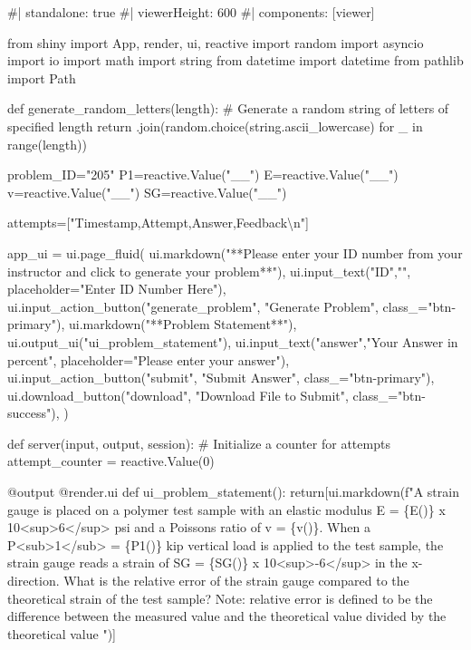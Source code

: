 \documentclass[
  letterpaper,
  DIV=11,
  numbers=noendperiod]{scrreprt}
\newenvironment{Shaded}{\begin{snugshade}}{\end{snugshade}}
\newcommand{\NormalTok}[1]{\textcolor[rgb]{0.00,0.23,0.31}{#1}}
\begin{document}
\begin{Shaded}
\begin{Highlighting}[]
\NormalTok{\#| standalone: true}
\NormalTok{\#| viewerHeight: 600}
\NormalTok{\#| components: [viewer]}

\NormalTok{from shiny import App, render, ui, reactive}
\NormalTok{import random}
\NormalTok{import asyncio}
\NormalTok{import io}
\NormalTok{import math}
\NormalTok{import string}
\NormalTok{from datetime import datetime}
\NormalTok{from pathlib import Path}

\NormalTok{def generate\_random\_letters(length):}
\NormalTok{    \# Generate a random string of letters of specified length}
\NormalTok{    return \textquotesingle{}\textquotesingle{}.join(random.choice(string.ascii\_lowercase) for \_ in range(length)) }

\NormalTok{problem\_ID="205"}
\NormalTok{P1=reactive.Value("\_\_")}
\NormalTok{E=reactive.Value("\_\_")}
\NormalTok{v=reactive.Value("\_\_")}
\NormalTok{SG=reactive.Value("\_\_")}



\NormalTok{attempts=["Timestamp,Attempt,Answer,Feedback\textbackslash{}n"]}

\NormalTok{app\_ui = ui.page\_fluid(}
\NormalTok{    ui.markdown("**Please enter your ID number from your instructor and click to generate your problem**"),}
\NormalTok{    ui.input\_text("ID","", placeholder="Enter ID Number Here"),}
\NormalTok{    ui.input\_action\_button("generate\_problem", "Generate Problem", class\_="btn{-}primary"),}
\NormalTok{    ui.markdown("**Problem Statement**"),}
\NormalTok{    ui.output\_ui("ui\_problem\_statement"),}
\NormalTok{    ui.input\_text("answer","Your Answer in percent", placeholder="Please enter your answer"),}
\NormalTok{    ui.input\_action\_button("submit", "Submit Answer", class\_="btn{-}primary"),}
\NormalTok{    ui.download\_button("download", "Download File to Submit", class\_="btn{-}success"),}
\NormalTok{)}


\NormalTok{def server(input, output, session):}
\NormalTok{    \# Initialize a counter for attempts}
\NormalTok{    attempt\_counter = reactive.Value(0)}

\NormalTok{    @output}
\NormalTok{    @render.ui}
\NormalTok{    def ui\_problem\_statement():}
\NormalTok{        return[ui.markdown(f"A strain gauge is placed on a polymer test sample with an elastic modulus E =  \{E()\} x 10\textless{}sup\textgreater{}6\textless{}/sup\textgreater{} psi and a Poisson\textquotesingle{}s ratio of v = \{v()\}. When a P\textless{}sub\textgreater{}1\textless{}/sub\textgreater{} = \{P1()\} kip vertical load is applied to the test sample, the strain gauge reads a strain of SG = \{SG()\} x 10\textless{}sup\textgreater{}{-}6\textless{}/sup\textgreater{} in the x{-}direction. What is the relative error of the strain gauge compared to the theoretical strain of the test sample? Note: relative error is defined to be the difference between the measured value and the theoretical value divided by the theoretical value ")]}
    

\end{Highlighting}
\end{Shaded}
\end{document}
